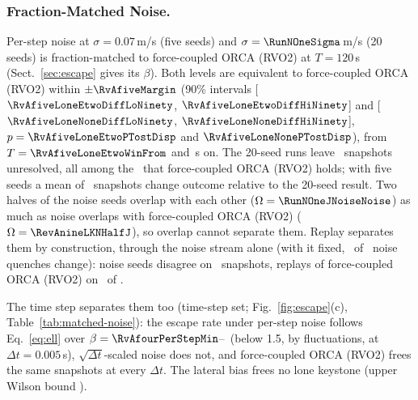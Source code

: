 \subsubsection{Fraction-Matched Noise.}
Per-step noise at $\sigma=0.07$\,m/s (five seeds) and $\sigma=\RunNOneSigma$\,m/s (20 seeds) is fraction-matched to force-coupled ORCA (RVO2) at $T=120$\,s (Sect.~\ref{sec:escape} gives its $\beta$). Both levels are equivalent to force-coupled ORCA (RVO2) within $\pm\RvAfiveMargin$ (90\% intervals [$\RvAfiveLoneEtwoDiffLoNinety$, $\RvAfiveLoneEtwoDiffHiNinety$] and [$\RvAfiveLoneNoneDiffLoNinety$, $\RvAfiveLoneNoneDiffHiNinety$], $p=\RvAfiveLoneEtwoPTostDisp$ and $\RvAfiveLoneNonePTostDisp$), from $T=\RvAfiveLoneEtwoWinFrom$ and \RvAfiveLoneNoneWinFrom\,s on.
The 20-seed runs leave \RevAnineLKNHalfA\ snapshots unresolved, all among the \RevAnineLKNHalfB\ that force-coupled ORCA (RVO2) holds; with five seeds a mean of \RevAnineMisclass\ snapshots change outcome relative to the 20-seed result. Two halves of the noise seeds overlap with each other ($\Omega=\RunNOneJNoiseNoise$) as much as noise overlaps with force-coupled ORCA (RVO2) ($\Omega=\RevAnineLKNHalfJ$), so overlap cannot separate them. Replay separates them by construction, through the noise stream alone (with it fixed, \RvAtenFlips\ of \RvAtenNPairs\ noise quenches change): noise seeds disagree on \RevAsevenLoneEtwoReplayDiscA\ snapshots, replays of force-coupled ORCA (RVO2) on \TabThreeLKRvoReplayDis\ of \TabThreeLKRvoReplays.

The time step separates them too (time-step set; Fig.~\ref{fig:escape}(c), Table~\ref{tab:matched-noise}): the escape rate under per-step noise follows Eq.~\eqref{eq:ell} over $\beta=\RvAfourPerStepMin$--\RvAfourPerStepMax\ (below 1.5, by fluctuations, at $\Delta t=0.005$\,s), $\sqrt{\Delta t}$-scaled noise does not, and force-coupled ORCA (RVO2) frees the same snapshots at every $\Delta t$. The lateral bias frees no lone keystone (upper Wilson bound \EtwoMaxBiasUpperLK).

